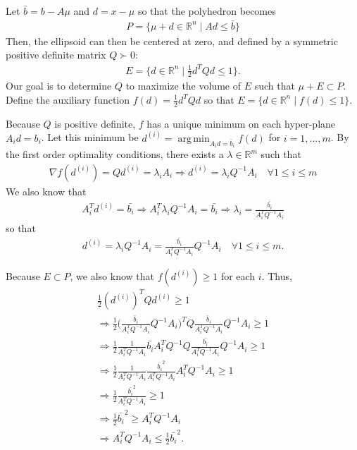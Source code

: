 \documentclass{article}
\theoremstyle{case}
\DeclareMathOperator*{\argmin}{arg\,min}
\newcommand{\gradf}{\nabla f}
\newcommand{\Rm}{\mathbb R^m}
\newcommand{\Rn}{\mathbb R^n}
\begin{document}
Let $\bar{b} = b - A\mu$ and $d = x - \mu$ so that the polyhedron becomes
\begin{align*}
P = \{ \mu + d \in \Rn \; | \;  Ad \le \bar{b} \}
\end{align*}
Then, the ellipsoid can then be centered at zero, and defined by a symmetric positive definite matrix $Q \succ 0$:
\begin{align*}
E = \{ d \in \Rn \; | \; \frac 1 2 d^T Q d \le 1 \}.
\end{align*}
Our goal is to determine $Q$ to maximize the volume of $E$ such that $\mu + E \subset P$.
Define the auxiliary function $f(d) = \frac 1 2 d^T Q d$ so that $E = \{ d \in \Rn\; | \; f(d) \le 1 \}$.

Because $Q$ is positive definite, $f$ has a unique minimum on each hyper-plane $A_i d = b_i$.
Let this minimum be $d^{(i)} = \argmin_{A_id =\bar{b}_i} f(d)$ for $i=1,\ldots,m$.
By the first order optimality conditions, there exists a $\lambda \in \Rm$ such that
\begin{align*}
\gradf(d^{(i)}) = Q d^{(i)} = \lambda_i A_i 
\Longrightarrow d^{(i)} = \lambda_i Q^{-1}A_i \quad \forall 1\le i\le m
\end{align*}
We also know that
\begin{align*}
A_i^T d^{(i)} = \bar{b_i} \Longrightarrow
A_i^T \lambda_i Q^{-1}A_i = \bar{b_i} \Longrightarrow
\lambda_i = \frac {\bar{b_i}}{A_i^T  Q^{-1}A_i}
\end{align*}
so that
\begin{align*}
d^{(i)} = \lambda_i Q^{-1}A_i = \frac {\bar{b_i}}{A_i^T  Q^{-1}A_i}  Q^{-1}A_i \quad \forall 1\le i\le m.
\end{align*}

Because $E \subset P$, we also know that $f(d^{(i)}) \ge 1$ for each $i$. Thus,
\begin{align*}
\frac 1 2 (d^{(i)})^{T} Q d^{(i)} \ge 1 \\
\Longrightarrow \frac 1 2 \bigg(\frac {\bar{b}_i}{A_i^T  Q^{-1}A_i}  Q^{-1}A_i\bigg)^{T} Q \frac {\bar{b}_i}{A_i^T  Q^{-1}A_i}  Q^{-1}A_i \ge 1 \\
\Longrightarrow \frac 1 2 \frac {1}{A_i^T  Q^{-1}A_i}  \bar{b_i} A_i^T Q^{-1} Q \frac {\bar{b_i}}{A_i^T  Q^{-1}A_i}  Q^{-1}A_i \ge 1 \\
\Longrightarrow \frac 1 2 \frac {1}{A_i^T  Q^{-1}A_i}  \frac {\bar{b_i}^2}{A_i^T  Q^{-1}A_i}  A_i^T Q^{-1}A_i \ge 1 \\
\Longrightarrow \frac 1 2  \frac {\bar{b_i}^2}{A_i^T  Q^{-1}A_i} \ge 1 \\
\Longrightarrow \frac 1 2 \bar{b_i}^2\ge A_i^T  Q^{-1}A_i \\
\Longrightarrow A_i^T  Q^{-1}A_i \le \frac 1 2 \bar{b_i}^2.
\end{align*}
\end{document}

